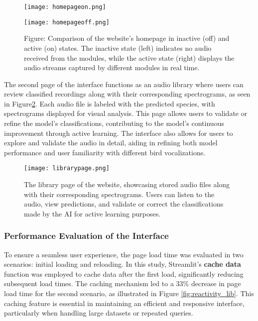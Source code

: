 \begin{figure}[h!]
    \centering
    \begin{minipage}{.5\textwidth}
        \centering
        \texttt{[image: homepageon.png]}
    \end{minipage}%
    \begin{minipage}{.5\textwidth}
        \centering
        \texttt{[image: homepageoff.png]}
    \end{minipage}
    \caption{Figure: Comparison of the website’s homepage in inactive (off) and active (on) states. The inactive state (left) indicates no audio received from the modules, while the active state (right) displays the audio streams captured by different modules in real time.}
    \label{fig:website}
\end{figure}


The second page of the interface functions as an audio library where users can review classified recordings along with their corresponding spectrograms, as seen in Figure\ref{fig:website_lib}. Each audio file is labeled with the predicted species, with spectrograms displayed for visual analysis. This page allows users to validate or refine the model’s classifications, contributing to the model’s continuous improvement through active learning. The interface also allows for users to explore and validate the audio in detail, aiding in refining both model performance and user familiarity with different bird vocalizations.

\begin{figure}[h!]
    \centering
    \texttt{[image: librarypage.png]}
    \caption{The library page of the website, showcasing stored audio files along with their corresponding spectrograms. Users can listen to the audio, view predictions, and validate or correct the classifications made by the AI for active learning purposes.}
    \vspace{0.1cm}
    \label{fig:website_lib}
\end{figure}

\subsubsection{Performance Evaluation of the Interface}
To ensure a seamless user experience, the page load time was evaluated in two scenarios: initial loading and reloading. In this study, Streamlit’s \textbf{cache data} function was employed to cache data after the first load, significantly reducing subsequent load times. The caching mechanism led to a 33\% decrease in page load time for the second scenario, as illustrated in Figure \ref{fig:reactivity_lib}. This caching feature is essential in maintaining an efficient and responsive interface, particularly when handling large datasets or repeated queries.


